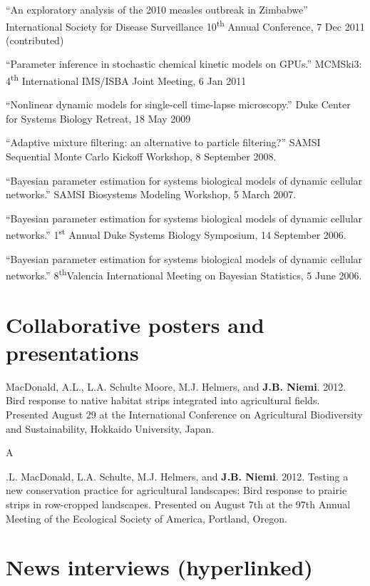 \documentclass[overlapped,line]{res}
\begin{document}
\begin{resume}
{``An exploratory analysis of the 2010 measles outbreak in Zimbabwe'' International Society for Disease Surveillance 10\textsuperscript{th} Annual Conference, 7 Dec 2011 (contributed)

``Parameter inference in stochastic chemical kinetic models on GPUs.'' MCMSki3: 4\textsuperscript{th} International IMS/ISBA Joint Meeting, 6 Jan 2011

``Nonlinear dynamic models for single-cell time-lapse microscopy.'' Duke Center for Systems Biology Retreat, 18 May 2009

``Adaptive mixture filtering: an alternative to particle filtering?'' SAMSI Sequential Monte Carlo Kickoff Workshop, 8 September 2008.

``Bayesian parameter estimation for systems biological models of dynamic cellular networks.'' SAMSI Biosystems Modeling Workshop, 5 March 2007.

``Bayesian parameter estimation for systems biological models of dynamic cellular networks.'' 1\textsuperscript{st} Annual Duke Systems Biology Symposium, 14 September 2006.

``Bayesian parameter estimation for systems biological models of dynamic cellular networks.'' 8\textsuperscript{th}Valencia International Meeting on Bayesian Statistics, 5 June 2006.

}

\section{Collaborative posters and presentations}


MacDonald, A.L., L.A. Schulte Moore, M.J. Helmers, and {\bf J.B. Niemi}.  2012.  Bird response to native habitat strips integrated into agricultural fields.  Presented August 29 at the International Conference on Agricultural Biodiversity and Sustainability, Hokkaido University, Japan.  

\newpage\opening 

A.L. MacDonald, L.A. Schulte, M.J. Helmers, and {\bf J.B. Niemi}.  2012.  Testing a new conservation practice for agricultural landscapes: Bird response to prairie strips in row-cropped landscapes.  Presented on August 7th at the 97th Annual Meeting of the Ecological Society of America, Portland, Oregon.

\section{\bf News interviews (hyperlinked)}


\end{resume}
\end{document}
